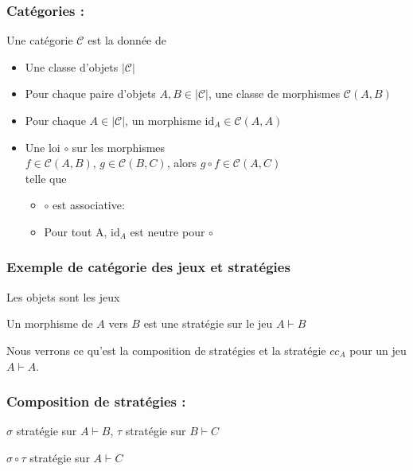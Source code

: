 \documentclass{beamer}
\begin{document}
\begin{frame}
\frametitle{Catégories :}


Une catégorie $\mathcal{C}$ est la donnée de
\begin{itemize}
\item Une classe d'objets $|\mathcal{C}|$
\pause
\item Pour chaque paire d'objets $A, B \in |\mathcal{C}|$, une classe de
morphismes $\mathcal{C}(A,B)$
\pause

\item Pour chaque $A \in |\mathcal{C}|$, un morphisme
$\text{id}_A \in \mathcal{C}(A,A)$
\pause

\item Une loi $\circ$ sur les morphismes\\
$f \in \mathcal{C}(A,B)$, $g \in \mathcal{C}(B,C)$, alors
$g \circ f \in \mathcal{C}(A,C)$\\
telle que
\pause
\begin{itemize}
\item $\circ$ est associative:
\pause
\item Pour tout A, $\text{id}_A$ est neutre pour $\circ$
\end{itemize}
\end{itemize}
\end{frame}

\begin{frame}
\frametitle{Exemple de catégorie des jeux et stratégies}

Les objets sont les jeux

Un morphisme de $A$ vers $B$ est une stratégie sur le jeu $A\vdash B$
\pause
{}

\pause
Nous verrons ce qu'est la composition de stratégies et la stratégie $cc_A$ pour un jeu $A \vdash A$.
\end{frame}

\begin{frame}
\frametitle{Composition de stratégies :}


$\sigma$ stratégie sur $A \vdash B$, $\tau$ stratégie sur $B \vdash C$

$\sigma \circ \tau$ stratégie sur $A \vdash C$


\end{frame}
\end{document}
